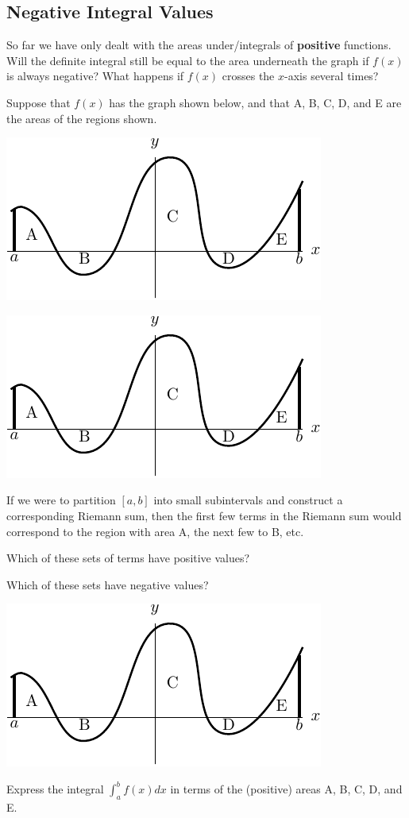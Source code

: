 \subsection*{Negative Integral Values}

So far we have only dealt with the areas under/integrals of {\bf
  positive} functions.  Will the definite integral still be equal to
the area underneath the graph if $f(x)$ is always negative?  What
happens if $f(x)$ crosses the $x$-axis several times?



\problem Suppose that $f(x)$ has the graph shown below, and that A, B,
  C, D, and E are the areas of the regions shown.

\begin{center}
\includegraphics[width=0.6\linewidth]{graphics/notes_04_negative_area_example}
\end{center}

\newpage
\begin{center}
\includegraphics[width=0.4\linewidth]{graphics/notes_04_negative_area_example}
\end{center}

If we were to partition $[a,b]$ into small subintervals and construct a corresponding Riemann sum, then the first few terms in the Riemann sum would correspond to the region with area A, the next few to B, etc. 

\problem 
Which of these sets of terms have positive values?

\vfill

Which of these sets have negative values?
\vfill

\newpage

\begin{center}
\includegraphics[width=0.3\linewidth]{graphics/notes_04_negative_area_example}
\end{center}
\problem 
{Express the integral $\displaystyle \int_a^b f(x) dx$ in
  terms of the (positive) areas A, B, C, D, and E.  }

